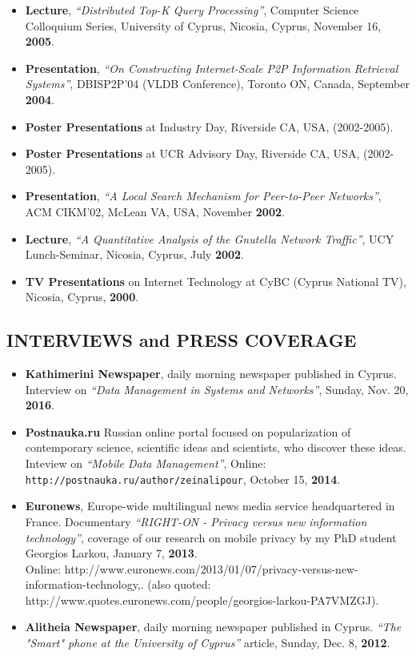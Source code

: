 \documentclass[10pt]{article}
\begin{document}
\begin{itemize}
\item  {\bf Lecture}, {\em ``Distributed Top-K Query Processing''}, Computer Science Colloquium Series,  University of Cyprus, Nicosia, Cyprus, November 16, {\bf 2005}.
\item  {\bf Presentation}, {\em ``On Constructing Internet-Scale P2P Information Retrieval Systems''}, DBISP2P'04 (VLDB Conference), Toronto ON, Canada, September {\bf 2004}.
\item  {\bf Poster Presentations} at Industry Day, Riverside CA, USA, (2002-2005).
\item  {\bf Poster Presentations} at UCR Advisory Day, Riverside CA, USA, (2002-2005).
\item  {\bf Presentation}, {\em ``A Local Search Mechanism for Peer-to-Peer Networks''}, ACM CIKM'02, McLean VA, USA, November {\bf 2002}. 
\item  {\bf Lecture}, {\em ``A Quantitative Analysis of the Gnutella Network Traffic''}, UCY Lunch-Seminar, Nicosia, Cyprus, July {\bf 2002}. 
\item  {\bf TV Presentations} on Internet Technology at CyBC (Cyprus National TV), Nicosia, Cyprus, {\bf 2000}.  
\end{itemize}

\subsection*{\bf INTERVIEWS and PRESS COVERAGE}
\begin{itemize}
\setlength{\itemsep}{0.10ex}
%
\item  {\bf Kathimerini Newspaper},  daily morning newspaper published in Cyprus. Interview on {\em ``Data Management in Systems and Networks''}, Sunday, Nov. 20, {\bf 2016}.
%
\item  {\bf Postnauka.ru} Russian online portal focused on popularization of contemporary science, scientific ideas and scientists, who discover these ideas. Inteview on {\em ``Mobile Data Management''}, Online: {\tt http://postnauka.ru/author/zeinalipour}, October 15, {\bf 2014}.
%
\item  {\bf Euronews}, Europe-wide multilingual news media service headquartered in France.  Documentary {\em ``RIGHT-ON - Privacy versus new information technology''}, coverage of our research on mobile privacy by my PhD student Georgios Larkou, January 7,  {\bf 2013}. \\ Online: http://www.euronews.com/2013/01/07/privacy-versus-new-information-technology,. (also quoted: http://www.quotes.euronews.com/people/georgios-larkou-PA7VMZGJ).
%
\item  {\bf Alitheia Newspaper}, daily morning newspaper published in Cyprus. {\em ``The "Smart" phone at the University of Cyprus''} article, Sunday, Dec. 8, {\bf 2012}.
\end{itemize}
\end{document}
